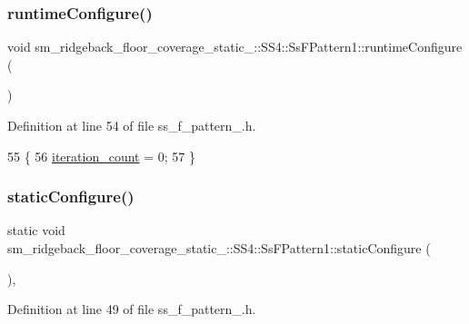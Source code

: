 \subsubsection{\texorpdfstring{runtime\+Configure()}{runtimeConfigure()}}
{\footnotesize\ttfamily void sm\+\_\+ridgeback\+\_\+floor\+\_\+coverage\+\_\+static\+\_\+::\+S\+S4\+::\+Ss\+F\+Pattern1\+::runtime\+Configure (\begin{DoxyParamCaption}{ }\end{DoxyParamCaption})\hspace{0.3cm}{\ttfamily [inline]}}



Definition at line 54 of file ss\+\_\+f\+\_\+pattern\+\_.\+h.


\begin{DoxyCode}
55     \{
56         \hyperlink{structsm__ridgeback__floor__coverage__static__1_1_1SS4_1_1SsFPattern1_a7bd988f5e0b7033d14d151da3ef3613a}{iteration\_count} = 0;
57     \}
\end{DoxyCode}
\mbox{\label{structsm__ridgeback__floor__coverage__static__1_1_1SS4_1_1SsFPattern1_a18194d011747edda9d4819816e339cde}} 
\subsubsection{\texorpdfstring{static\+Configure()}{staticConfigure()}}
{\footnotesize\ttfamily static void sm\+\_\+ridgeback\+\_\+floor\+\_\+coverage\+\_\+static\+\_\+::\+S\+S4\+::\+Ss\+F\+Pattern1\+::static\+Configure (\begin{DoxyParamCaption}{ }\end{DoxyParamCaption})\hspace{0.3cm}{\ttfamily [inline]}, {\ttfamily [static]}}



Definition at line 49 of file ss\+\_\+f\+\_\+pattern\+\_.\+h.


